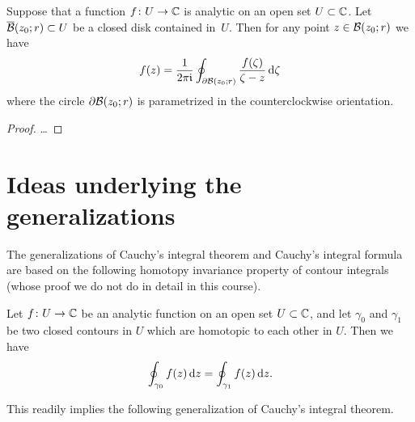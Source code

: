 \begin{corollary}
  \label{cor:cauchy_formula_circle}
  Suppose that a function $f \colon U \to \bC$ is analytic on an open
  set $U \subset \bC$.
  Let $\CDiskRC{r}{z_0} \subset U$ be a closed disk contained in~$U$.
  Then for any point $z \in \DiskRC{r}{z_0}$ we have
  \begin{align*}
    f(z) = \frac{1}{2\pi \ii}
        \oint_{\bdry \DiskRC{r}{z_0}} \frac{f(\zeta)}{\zeta - z} \, \ud \zeta
  \end{align*}
  where the circle $\bdry \DiskRC{r}{z_0}$ is parametrized in the
  counterclockwise orientation.
\end{corollary}
\begin{proof}
  \ldots
\end{proof}



\section{Ideas underlying the generalizations}

The generalizations of Cauchy's integral theorem and Cauchy's integral
formula are based on the following homotopy invariance property of
contour integrals (whose proof we do not do in detail in this course).

\begin{lemma}
  \label{lem:homotopy_invariance}
  Let $f \colon U \to \bC$ be an analytic function on an open
  set $U \subset \bC$, and let $\gamma_0$ and $\gamma_1$ be two
  closed contours in $U$ which are homotopic to each other in $U$.
  Then we have
  \begin{align*}
    \oint_{\gamma_0} f(z) \, \ud z = \oint_{\gamma_1} f(z) \, \ud z .
  \end{align*}
\end{lemma}

This readily implies the following generalization of Cauchy's integral
theorem.

